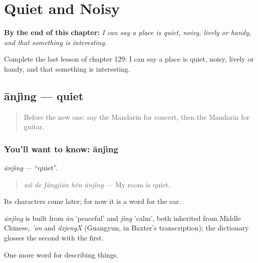 
\chapter{Quiet and Noisy}
\label{ch:zh-quiet-and-noisy}

\begin{chapteropening}
\textbf{By the end of this chapter:} \emph{I can say a place is quiet, noisy, lively or handy, and that something is interesting.}

Complete the last lesson of chapter 129: I can say a place is quiet, noisy, lively or handy, and that something is interesting.
\end{chapteropening}

\section[ānjìng]{ānjìng — quiet}

\label{lesson:ZH-C129-anjing}



\begin{quote}
Before the new one: say the Mandarin for concert, then the Mandarin for guitar.
\end{quote}

\subsection*{You'll want to know: ānjìng}
\emph{ānjìng} — \textquotedblleft{}quiet\textquotedblright{}.

\begin{quote}
\emph{wǒ de fángjiān hěn ānjìng} — My room is quiet.
\end{quote}

Its characters come later; for now it is a word for the ear.

\begin{cousinweb}
\emph{ānjìng} is built from \emph{ān} 'peaceful' and \emph{jìng} 'calm', both inherited from Middle Chinese, \emph{'an} and \emph{dzjengX} (Guangyun, in Baxter's transcription); the dictionary glosses the second with the first.
\end{cousinweb}

\begin{grammarlens}[title={What you've built}]
One more word for describing things.
\end{grammarlens}

